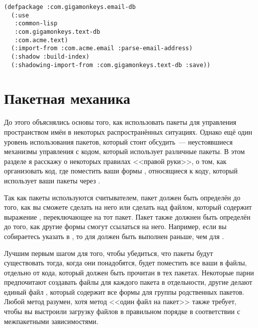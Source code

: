 \begin{lstlisting}
(defpackage :com.gigamonkeys.email-db
  (:use
   :common-lisp
   :com.gigamonkeys.text-db
   :com.acme.text)
  (:import-from :com.acme.email :parse-email-address)
  (:shadow :build-index)
  (:shadowing-import-from :com.gigamonkeys.text-db :save))
\end{lstlisting}

\section{Пакетная механика}

До этого объяснялись основы того, как использовать пакеты для управления пространством
имён в некоторых распространённых ситуациях. Однако ещё один уровень использования
пакетов, который стоит обсудить~--- неустоявшиеся механизмы управления с кодом, который
использует различные пакеты. В этом разделе я расскажу о некоторых правилах <<правой
руки>>, о том, как организовать код, где поместить ваши формы ,
относящиеся к коду, который использует ваши пакеты через .

Так как пакеты используются считывателем, пакет должен быть определён до того, как вы
сможете сделать  на него или сделать  над файлом, который
содержит выражение , переключающее на тот пакет. Пакет также должнен быть
определён до того, как другие формы  смогут ссылаться на него. Например,
если вы собираетесь указать  в
, то  для 
должен быть выполнен раньше, чем  для .

Лучшим первым шагом для того, чтобы убедиться, что пакеты будут существовать тогда, когда
они понадобятся, будет поместить все ваши  в файлы, отдельно от кода,
который должен быть прочитан в тех пакетах. Некоторые парни предпочитают создавать файлы
 для каждого пакета в отдельности, другие делают единый файл
, который содержит все  формы для группы родственных
пакетов. Любой метод разумен, хотя метод <<один файл на пакет>> также требует, чтобы вы
выстроили загрузку файлов в правильном порядке в соответствии с межпакетными
зависимостями.

